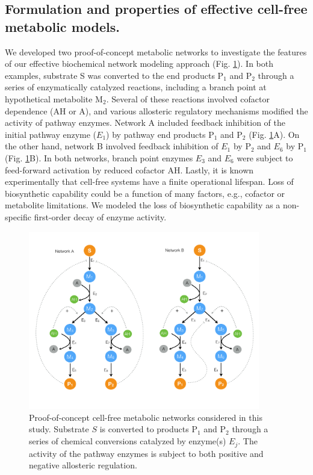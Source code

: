 \documentclass[processes,article,accept,moreauthors,pdftex,12pt,a4paper]{mdpi}
\begin{document}
\subsection{Formulation and properties of effective cell-free metabolic models.}

We developed two proof-of-concept metabolic networks to investigate the features of our effective biochemical network modeling approach (Fig. \ref{fig-networks}). 
In both examples, substrate S was converted to the end products P$_{1}$ and P$_{2}$ through a series of enzymatically catalyzed reactions, including a branch point at hypothetical metabolite M$_{2}$. 
Several of these reactions involved cofactor dependence (AH or A), and various allosteric regulatory mechanisms modified the activity of pathway enzymes. 
Network A included feedback inhibition of the initial pathway enzyme ($E_{1}$) by pathway end products P$_{1}$ and P$_{2}$ (Fig. \ref{fig-networks}A). 
On the other hand, network B involved feedback inhibition of $E_{1}$ by P$_{2}$ and $E_{6}$ by P$_{1}$ (Fig. \ref{fig-networks}B). 
In both networks, branch point enzymes $E_{3}$ and $E_{6}$ were subject to feed-forward activation by reduced cofactor AH. 
Lastly, it is known experimentally that cell-free systems have a finite operational lifespan. 
Loss of biosynthetic capability could be a function of many factors, e.g., cofactor or metabolite limitations. 
We modeled the loss of biosynthetic capability as a non-specific first-order decay of enzyme activity.

\begin{figure}[H]
\centering
\includegraphics[width=0.9\textwidth]{./figs/Figure-1-Networks.pdf}
\caption{Proof-of-concept cell-free metabolic networks considered in this study. Substrate $S$ is converted to products P$_{1}$ and P$_{2}$ through a series of chemical conversions
catalyzed by enzyme(s) $E_{j}$. The activity of the pathway enzymes is subject to both positive and negative allosteric regulation.}\label{fig-networks}
\end{figure}
\end{document}
